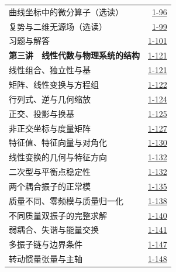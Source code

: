 \begin{longtable}{@{}p{}r@{}}
\hspace{1em}曲线坐标中的微分算子（选读）&\href{course-page:1:101}{1-96}\\[2pt]
\hspace{1em}复势与二维无源场（选读）&\href{course-page:1:104}{1-99}\\[2pt]
\hspace{1em}习题与解答&\href{course-page:1:106}{1-101}\\[2pt]
\textbf{第三讲　线性代数与物理系统的结构}&\href{course-page:1:126}{1-121}\\[2pt]
\hspace{1em}线性组合、独立性与基&\href{course-page:1:126}{1-121}\\[2pt]
\hspace{1em}矩阵、线性变换与方程组&\href{course-page:1:127}{1-122}\\[2pt]
\hspace{1em}行列式、逆与几何缩放&\href{course-page:1:129}{1-124}\\[2pt]
\hspace{1em}正交、投影与换基&\href{course-page:1:130}{1-125}\\[2pt]
\hspace{1em}非正交坐标与度量矩阵&\href{course-page:1:132}{1-127}\\[2pt]
\hspace{1em}特征值、特征向量与对角化&\href{course-page:1:135}{1-130}\\[2pt]
\hspace{1em}线性变换的几何与特征方向&\href{course-page:1:137}{1-132}\\[2pt]
\hspace{1em}二次型与平衡点稳定性&\href{course-page:1:137}{1-132}\\[2pt]
\hspace{1em}两个耦合振子的正常模&\href{course-page:1:140}{1-135}\\[2pt]
\hspace{1em}质量不同、零频模与质量归一化&\href{course-page:1:143}{1-138}\\[2pt]
\hspace{1em}不同质量双振子的完整求解&\href{course-page:1:145}{1-140}\\[2pt]
\hspace{1em}弱耦合、失谐与能量交换&\href{course-page:1:146}{1-141}\\[2pt]
\hspace{1em}多振子链与边界条件&\href{course-page:1:152}{1-147}\\[2pt]
\hspace{1em}转动惯量张量与主轴&\href{course-page:1:153}{1-148}\\[2pt]

\end{longtable}
